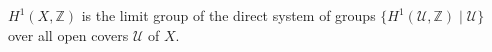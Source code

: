 
$H^1(X, \mathbb{Z})$ is the limit group of the direct system of groups $\{H^1(\mathcal{U}, \mathbb{Z}) \mid \mathcal{U}\}$ over all open covers $\mathcal{U}$ of $X$.
